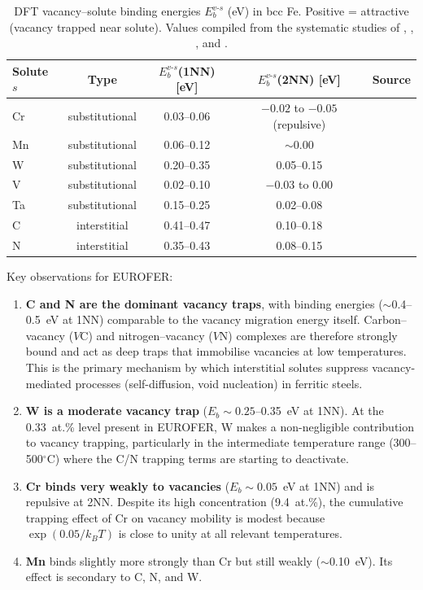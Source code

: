 \documentclass[pdflatex,sn-basic]{sn-jnl} %
\begin{document}
\begin{table}[htbp]
\centering
\caption{DFT vacancy--solute binding energies $E_b^{v\text{-}s}$ (eV) in bcc
Fe. Positive = attractive (vacancy trapped near solute). Values compiled from
the systematic studies of \cite{Olsson2010}, \cite{Devi2018},
\cite{Domain2004}, and \cite{Ohnuma2009}.}
\label{tab:Eb_vac_solute}
\begin{tabular}{lcccl}
\toprule
Solute $s$ & Type & $E_b^{v\text{-}s}$(1NN) [eV] & $E_b^{v\text{-}s}$(2NN) [eV] & Source \\
\midrule
Cr  & substitutional & 0.03--0.06  & $-0.02$ to $-0.05$ (repulsive) & \cite{Olsson2010,Devi2018} \\
Mn  & substitutional & 0.06--0.12  & $\sim$0.00 & \cite{Olsson2010,Devi2018} \\
W   & substitutional & 0.20--0.35  & 0.05--0.15 & \cite{Olsson2010,Devi2018} \\
V   & substitutional & 0.02--0.10  & $-0.03$ to 0.00 & \cite{Olsson2010} \\
Ta  & substitutional & 0.15--0.25  & 0.02--0.08 & \cite{Devi2018} \\
C   & interstitial   & 0.41--0.47  & 0.10--0.18 & \cite{Domain2004,Ohnuma2009} \\
N   & interstitial   & 0.35--0.43  & 0.08--0.15 & \cite{Domain2004,Ohnuma2009} \\
\bottomrule
\end{tabular}
\end{table}

Key observations for EUROFER:
\begin{enumerate}
\item \textbf{C and N are the dominant vacancy traps}, with binding energies
($\sim$0.4--0.5~eV at 1NN) comparable to the vacancy migration energy itself.
Carbon--vacancy ($V$C) and nitrogen--vacancy ($V$N) complexes are therefore
strongly bound and act as deep traps that immobilise vacancies at low
temperatures. This is the primary mechanism by which interstitial solutes
suppress vacancy-mediated processes (self-diffusion, void nucleation) in
ferritic steels.

\item \textbf{W is a moderate vacancy trap} ($E_b \sim 0.25$--0.35~eV at 1NN).
At the 0.33~at.\% level present in EUROFER, W makes a non-negligible
contribution to vacancy trapping, particularly in the intermediate temperature
range (300--500$^\circ$C) where the C/N trapping terms are starting to
deactivate.

\item \textbf{Cr binds very weakly to vacancies} ($E_b \sim 0.05$~eV at 1NN)
and is repulsive at 2NN. Despite its high concentration (9.4~at.\%), the
cumulative trapping effect of Cr on vacancy mobility is modest because
$\exp(0.05/k_BT)$ is close to unity at all relevant temperatures.

\item \textbf{Mn} binds slightly more strongly than Cr but still weakly
($\sim$0.10~eV). Its effect is secondary to C, N, and W.
\end{enumerate}
\end{document}
